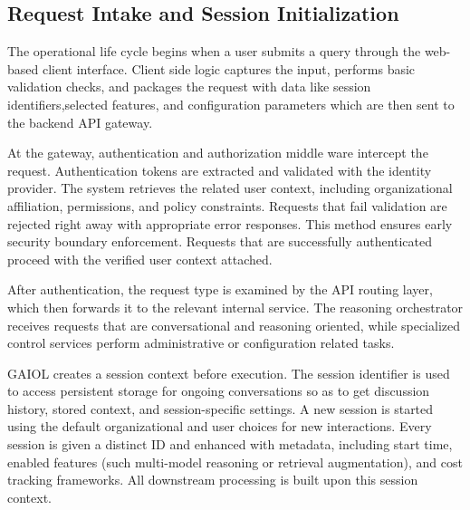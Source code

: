 \documentclass[final,5p,times,twocolumn,authoryear,draft]{elsarticle}
\begin{document}
        


\subsection{Request Intake and Session Initialization}

The operational life cycle begins when a user submits a query through the web-based client interface. Client side logic captures the input, performs basic validation checks, and packages the request with data like  session identifiers,selected features, and configuration parameters which are then sent to the backend API gateway.

At the gateway, authentication and authorization middle ware intercept the request. Authentication tokens are extracted and validated with the identity provider. The system retrieves the related user context, including organizational affiliation, permissions, and policy constraints. Requests that fail validation are rejected right away with appropriate error responses. This method ensures early security boundary enforcement. Requests that are successfully authenticated proceed with the verified user context attached. 

After authentication, the request type is examined by the API routing layer, which then forwards it to the relevant internal service. The reasoning orchestrator receives requests that are conversational and reasoning oriented, while specialized control services perform administrative or configuration related tasks.

GAIOL creates a session context before execution. The session identifier is used to access persistent storage for ongoing conversations so as to get discussion history, stored context, and session-specific settings. A new session is started using the default organizational and user choices for new interactions. Every session is given a distinct ID and enhanced with metadata, including start time, enabled features (such multi-model reasoning or retrieval augmentation), and cost tracking frameworks. All downstream processing is built upon this session context.
\end{document}
